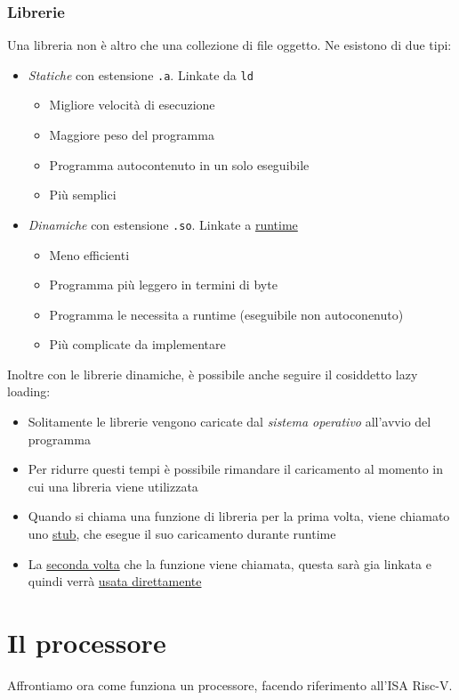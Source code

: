 \subsubsection*{Librerie}
Una libreria non è altro che una collezione di file oggetto. Ne esistono di due tipi:
\begin{itemize}
	\item \textit{Statiche} con estensione \verb|.a|. Linkate da \verb|ld|
	      \begin{itemize}
		      \item Migliore velocità di esecuzione
		      \item Maggiore peso del programma
		      \item Programma autocontenuto in un solo eseguibile
		      \item Più semplici
	      \end{itemize}
	\item \textit{Dinamiche} con estensione \verb|.so|. Linkate a \underline{runtime}
	      \begin{itemize}
		      \item Meno efficienti
		      \item Programma più leggero in termini di byte
		      \item Programma le necessita a runtime (eseguibile non autoconenuto)
		      \item Più complicate da implementare
	      \end{itemize}
\end{itemize}
Inoltre con le librerie dinamiche, è possibile anche seguire il cosiddetto lazy loading:
\begin{itemize}
	\item Solitamente le librerie vengono caricate dal \textit{sistema operativo} all'avvio del programma
	\item Per ridurre questi tempi è possibile rimandare il caricamento al momento in cui una libreria viene utilizzata
	\item Quando si chiama una funzione di libreria per la prima volta, viene chiamato uno \underline{stub}, che esegue il suo caricamento durante runtime
	\item La \underline{seconda volta} che la funzione viene chiamata, questa sarà gia linkata e quindi verrà \underline{usata direttamente}
\end{itemize}
\section{Il processore}
Affrontiamo ora come funziona un processore, facendo riferimento all'ISA Risc-V.
